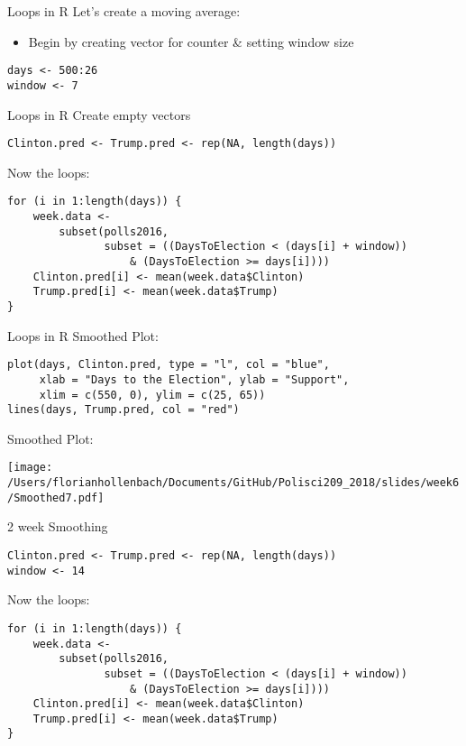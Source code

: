 \documentclass[presentation]{beamer}
\begin{document}
\begin{frame}[fragile,label={sec:org32b5e52}]{Loops in R}
 Let's create a moving average:

\begin{itemize}
\item Begin by creating vector for counter \& setting window size
\end{itemize}

\begin{verbatim}
days <- 500:26
window <- 7
\end{verbatim}
\end{frame}


\begin{frame}[fragile,shrink=25,label={sec:orga0c0ea7}]{Loops in R}
 Create empty vectors

\begin{verbatim}
Clinton.pred <- Trump.pred <- rep(NA, length(days))
\end{verbatim}
\pause


Now the loops:
\begin{verbatim}
for (i in 1:length(days)) {
    week.data <-
        subset(polls2016,
               subset = ((DaysToElection < (days[i] + window))
                   & (DaysToElection >= days[i])))
    Clinton.pred[i] <- mean(week.data$Clinton)
    Trump.pred[i] <- mean(week.data$Trump)
}
\end{verbatim}
\end{frame}

\begin{frame}[fragile,label={sec:orgf650510}]{Loops in R}
 Smoothed Plot:
\begin{verbatim}
plot(days, Clinton.pred, type = "l", col = "blue",
     xlab = "Days to the Election", ylab = "Support",
     xlim = c(550, 0), ylim = c(25, 65))
lines(days, Trump.pred, col = "red")
\end{verbatim}
\end{frame}


\begin{frame}[label={sec:org104985b}]{Smoothed Plot:}
\begin{center}
\texttt{[image: /Users/florianhollenbach/Documents/GitHub/Polisci209\_2018/slides/week6/Smoothed7.pdf]}
\end{center}
\end{frame}



\begin{frame}[fragile,shrink=25,label={sec:org25c8ca0}]{2 week Smoothing}
 \begin{verbatim}
Clinton.pred <- Trump.pred <- rep(NA, length(days))
window <- 14

\end{verbatim}
\pause


Now the loops:
\begin{verbatim}
for (i in 1:length(days)) {
    week.data <-
        subset(polls2016,
               subset = ((DaysToElection < (days[i] + window))
                   & (DaysToElection >= days[i])))
    Clinton.pred[i] <- mean(week.data$Clinton)
    Trump.pred[i] <- mean(week.data$Trump)
}
\end{verbatim}
\end{frame}
\end{document}
